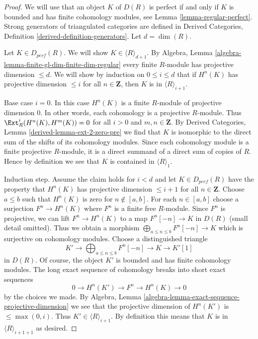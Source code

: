 \begin{proof}
We will use that an object $K$ of $D(R)$ is perfect if and only
if $K$ is bounded and has finite cohomology modules, see
Lemma \ref{lemma-regular-perfect}.
Strong generators of triangulated categories are defined in
Derived Categories, Definition \ref{derived-definition-generators}.
Let $d = \dim(R)$.

\medskip\noindent
Let $K \in D_{perf}(R)$. We will show $K \in \langle R \rangle_{d + 1}$.
By Algebra, Lemma \ref{algebra-lemma-finite-gl-dim-finite-dim-regular}
every finite $R$-module has projective dimension $\leq d$.
We will show by induction on $0 \leq i \leq d$ that
if $H^n(K)$ has projective dimension $\leq i$ for all
$n \in \mathbf{Z}$, then $K$ is in $\langle R \rangle_{i + 1}$.

\medskip\noindent
Base case $i = 0$. In this case $H^n(K)$ is a finite $R$-module
of projective dimension $0$. In other words, each cohomology
is a projective $R$-module. Thus $\Ext^i_R(H^n(K), H^m(K)) = 0$
for all $i > 0$ and $m, n \in \mathbf{Z}$. By
Derived Categories, Lemma \ref{derived-lemma-ext-2-zero-pre}
we find that $K$ is isomorphic to the direct sum of the shifts of its
cohomology modules. Since each cohomology module is a finite
projective $R$-module, it is a direct summand of a direct sum
of copies of $R$. Hence by definition we see that $K$
is contained in $\langle R \rangle_1$.

\medskip\noindent
Induction step. Assume the claim holds for $i < d$ and let
$K \in D_{perf}(R)$ have the property that $H^n(K)$ has
projective dimension $\leq i + 1$ for all $n \in \mathbf{Z}$.
Choose $a \leq b$ such that $H^n(K)$ is zero for $n \not \in [a, b]$.
For each $n \in [a, b]$ choose a surjection $F^n \to H^n(K)$
where $F^n$ is a finite free $R$-module. Since $F^n$ is projective,
we can lift $F^n \to H^n(K)$ to a map $F^n[-n] \to K$ in $D(R)$
(small detail omitted). Thus we obtain a morphism
$\bigoplus_{a \leq n \leq b} F^n[-n] \to K$
which is surjective on cohomology modules.
Choose a distinguished triangle
$$
K' \to \bigoplus\nolimits_{a \leq n \leq b} F^n[-n] \to K \to K'[1]
$$
in $D(R)$. Of course, the object $K'$ is bounded and has
finite cohomology modules. The long exact sequence of cohomology
breaks into short exact sequences
$$
0 \to H^n(K') \to F^n \to H^n(K) \to 0
$$
by the choices we made. By
Algebra, Lemma \ref{algebra-lemma-exact-sequence-projective-dimension}
we see that the projective dimension of $H^n(K')$ is $\leq \max(0, i)$.
Thus $K' \in \langle R \rangle_{i + 1}$. By definition this means
that $K$ is in $\langle R \rangle_{i + 1 + 1}$ as desired.
\end{proof}


